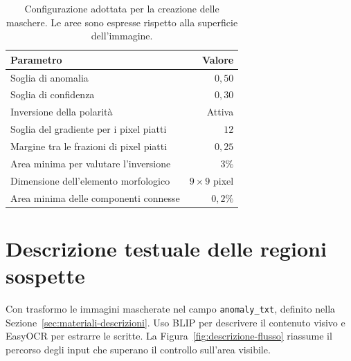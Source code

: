 \begin{table}[htbp]
    \centering
    \small
    \caption{Configurazione adottata per la creazione delle maschere. Le aree sono espresse rispetto alla superficie dell'immagine.}
    \label{tab:metodi-maschere-parametri}
    \begin{tabular}{@{}lr@{}}
        \toprule
        Parametro & Valore \\
        \midrule
        Soglia di anomalia & $0{,}50$ \\
        Soglia di confidenza & $0{,}30$ \\
        Inversione della polarità & Attiva \\
        Soglia del gradiente per i pixel piatti & $12$ \\
        Margine tra le frazioni di pixel piatti & $0{,}25$ \\
        Area minima per valutare l'inversione & $3\%$ \\
        Dimensione dell'elemento morfologico & $9\times9$ pixel \\
        Area minima delle componenti connesse & $0{,}2\%$ \\
        \bottomrule
    \end{tabular}
\end{table}

\section{Descrizione testuale delle regioni sospette}
\label{sec:metodi-descrizioni}

Con  trasformo le immagini mascherate nel campo \texttt{anomaly\_txt}, definito nella Sezione~\ref{sec:materiali-descrizioni}. Uso BLIP per descrivere il contenuto visivo e EasyOCR per estrarre le scritte. La Figura~\ref{fig:descrizione-flusso} riassume il percorso degli input che superano il controllo sull'area visibile.

